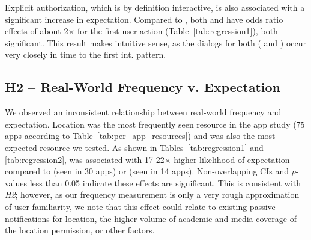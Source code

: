 Explicit authorization, which is by definition interactive, is also associated with a significant increase in expectation.
Compared to \never{}, both \first{} and \launch{} have odds ratio effects of about 2$\times$ 
for the first user action (Table~\ref{tab:regression1}), both significant. This result makes intuitive sense, as the dialogs for both 
(\first{} and \launch{}) occur very closely in time to the first int. pattern. 




\subsection{H2 -- Real-World Frequency v. Expectation}

We observed an inconsistent relationship between real-world frequency and
expectation. Location was the most frequently seen 
resource in the app study (75 apps according to Table~\ref{tab:per_app_resources}) and was also the most expected 
resource we tested. As shown in Tables~\ref{tab:regression1} and \ref{tab:regression2}, \location{} was
associated with 17-22$\times$ higher likelihood of expectation compared to \contacts{} (seen in 30 apps) or \mic{} (seen in 14 apps).
Non-overlapping CIs and $p$-values less than 0.05 indicate these
effects are significant. This is consistent with \emph{H2}; however,
as our frequency measurement is only a very rough approximation
of user familiarity, we note that this effect could relate to existing passive
notifications for location, the higher volume of academic and
media coverage of the location permission, or other factors.

